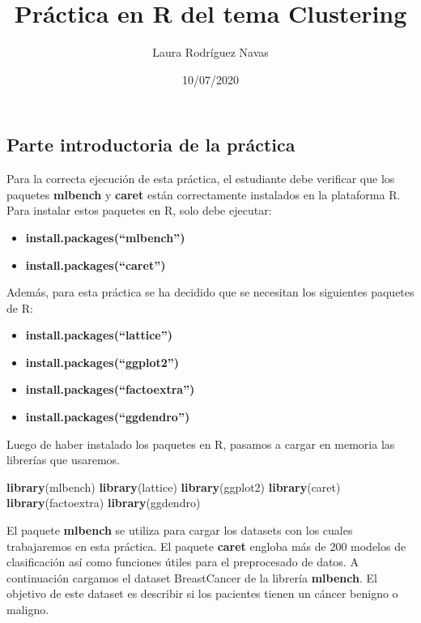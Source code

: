 \documentclass[]{article}
\title{Práctica en R del tema Clustering}
\author{Laura Rodríguez Navas}
\date{10/07/2020}
\newenvironment{Shaded}{\begin{snugshade}}{\end{snugshade}}
\newcommand{\KeywordTok}[1]{\textcolor[rgb]{0.13,0.29,0.53}{\textbf{#1}}}
\newcommand{\NormalTok}[1]{#1}
\providecommand{\tightlist}{%
  \setlength{\itemsep}{0pt}\setlength{\parskip}{0pt}}
\begin{document}
\maketitle

\hypertarget{parte-introductoria-de-la-pruxe1ctica}{%
\subsection{Parte introductoria de la
práctica}\label{parte-introductoria-de-la-pruxe1ctica}}

Para la correcta ejecución de esta práctica, el estudiante debe
verificar que los paquetes \textbf{mlbench} y \textbf{caret} están
correctamente instalados en la plataforma R. Para instalar estos
paquetes en R, solo debe ejecutar:

\begin{itemize}
\tightlist
\item
  \textbf{install.packages(``mlbench'')}
\item
  \textbf{install.packages(``caret'')}
\end{itemize}

Además, para esta práctica se ha decidido que se necesitan los
siguientes paquetes de R:

\begin{itemize}
\tightlist
\item
  \textbf{install.packages(``lattice'')}
\item
  \textbf{install.packages(``ggplot2'')}
\item
  \textbf{install.packages(``factoextra'')}
\item
  \textbf{install.packages(``ggdendro'')}
\end{itemize}

Luego de haber instalado los paquetes en R, pasamos a cargar en memoria
las librerías que usaremos.

\begin{Shaded}
\begin{Highlighting}[]
\KeywordTok{library}\NormalTok{(mlbench)}
\KeywordTok{library}\NormalTok{(lattice)}
\KeywordTok{library}\NormalTok{(ggplot2)}
\KeywordTok{library}\NormalTok{(caret)}
\KeywordTok{library}\NormalTok{(factoextra)}
\KeywordTok{library}\NormalTok{(ggdendro)}
\end{Highlighting}
\end{Shaded}

El paquete \textbf{mlbench} se utiliza para cargar los datasets con los
cuales trabajaremos en esta práctica. El paquete \textbf{caret} engloba
más de 200 modelos de clasificación así como funciones útiles para el
preprocesado de datos. A continuación cargamos el dataset BreastCancer
de la librería \textbf{mlbench}. El objetivo de este dataset es
describir si los pacientes tienen un cáncer benigno o maligno.
\end{document}
